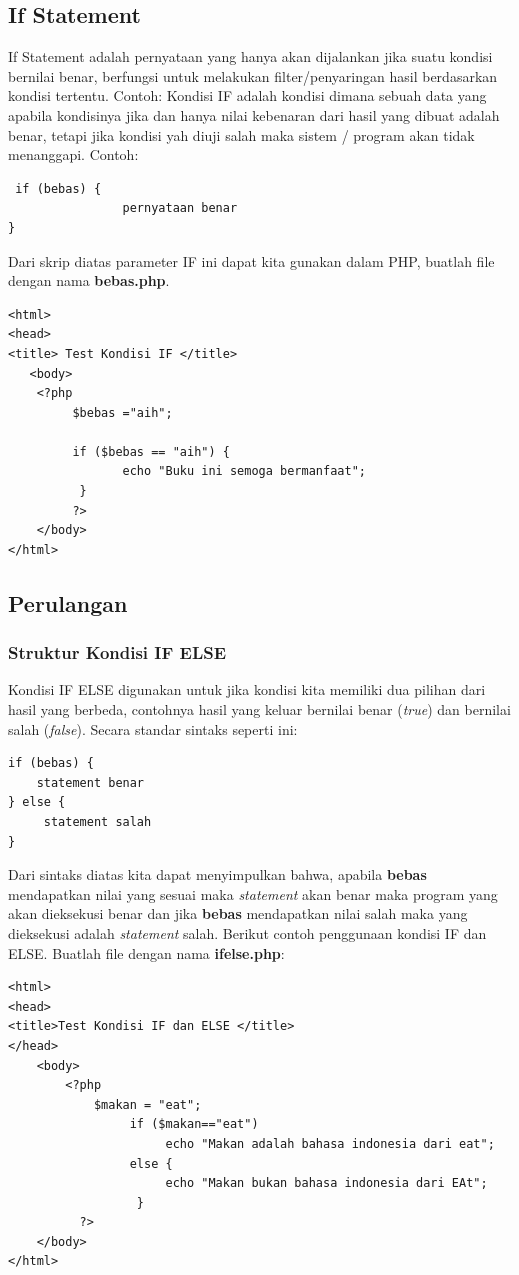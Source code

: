 \subsection{If Statement}
If Statement  adalah pernyataan yang hanya akan dijalankan jika suatu kondisi bernilai benar, berfungsi untuk melakukan filter/penyaringan hasil berdasarkan kondisi tertentu. Contoh:
Kondisi IF adalah kondisi dimana sebuah data yang apabila kondisinya jika dan hanya nilai kebenaran dari hasil yang dibuat adalah benar, tetapi jika kondisi yah diuji salah maka sistem / program akan tidak menanggapi. Contoh:
\begin{lstlisting}
 if (bebas) {
                pernyataan benar
}
\end{lstlisting}
Dari skrip diatas parameter IF ini dapat kita gunakan dalam PHP, buatlah file dengan nama \textbf{bebas.php}.
\begin{lstlisting}
<html>
<head>
<title> Test Kondisi IF </title>
   <body>
    <?php
         $bebas ="aih";

         if ($bebas == "aih") {
                echo "Buku ini semoga bermanfaat";
          }
         ?>
    </body>
</html>
\end{lstlisting}

\subsection{Perulangan}
\subsubsection{Struktur Kondisi IF ELSE}
Kondisi IF ELSE  digunakan untuk jika kondisi kita memiliki dua pilihan dari hasil yang berbeda, contohnya hasil yang keluar bernilai benar (\textit{true}) dan bernilai salah (\textit{false}). Secara standar sintaks seperti ini:
\begin{lstlisting}
if (bebas) {
    statement benar
} else {
     statement salah
}
\end{lstlisting}
Dari sintaks diatas kita dapat menyimpulkan bahwa, apabila \textbf{bebas} mendapatkan nilai yang sesuai maka \textit{statement} akan benar maka program yang akan dieksekusi benar dan jika \textbf{bebas} mendapatkan nilai salah maka yang dieksekusi adalah \textit{statement} salah. Berikut contoh penggunaan kondisi IF dan ELSE. Buatlah file dengan nama\textbf{ ifelse.php}:
\begin{lstlisting}
<html>
<head>
<title>Test Kondisi IF dan ELSE </title>
</head>
    <body>
        <?php
            $makan = "eat";
                 if ($makan=="eat")
                      echo "Makan adalah bahasa indonesia dari eat";
                 else {
                      echo "Makan bukan bahasa indonesia dari EAt";
                  }
          ?>
    </body>
</html>
\end{lstlisting}

